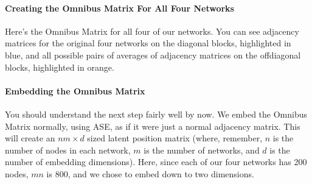 \documentclass[letterpaper,10pt,english]{jupyterBook}
\begin{document}
\noindent{}


\paragraph{Creating the Omnibus Matrix For All Four Networks}
\label{\detokenize{representations/ch6/multigraph-representation-learning:creating-the-omnibus-matrix-for-all-four-networks}}
\sphinxAtStartPar
Here’s the Omnibus Matrix for all four of our networks. You can see adjacency matrices for the original four networks on the diagonal blocks, highlighted in blue, and all possible pairs of averages of adjacency matrices on the off\sphinxhyphen{}diagonal blocks, highlighted in orange.

\noindent{}


\paragraph{Embedding the Omnibus Matrix}
\label{\detokenize{representations/ch6/multigraph-representation-learning:embedding-the-omnibus-matrix}}
\sphinxAtStartPar
You should understand the next step fairly well by now. We embed the Omnibus Matrix normally, using ASE, as if it were just a normal adjacency matrix. This will create an \(nm \times d\) sized latent position matrix (where, remember, \(n\) is the number of nodes in each network, \(m\) is the number of networks, and \(d\) is the number of embedding dimensions). Here, since each of our four networks has 200 nodes, \(mn\) is 800, and we chose to embed down to two dimensions.

\begin{sphinxVerbatim}[commandchars=\\\{\}]
   

     
    

\end{sphinxVerbatim}
\end{document}
